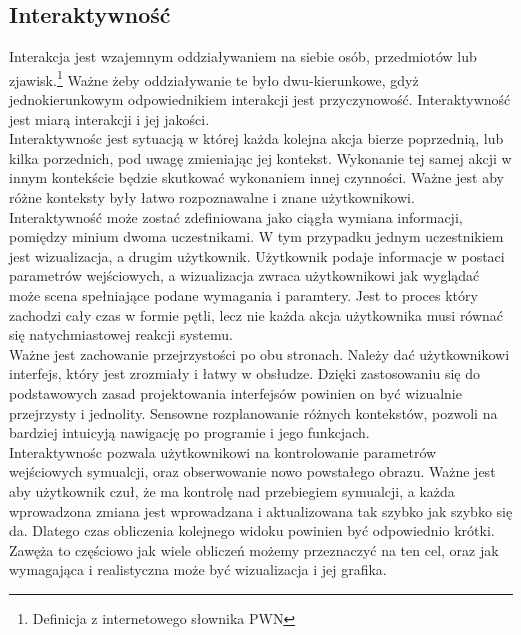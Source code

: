 \documentclass{article} %
\begin{document}
    \subsection{Interaktywność}
        Interakcja jest wzajemnym oddziaływaniem na siebie osób, przedmiotów lub zjawisk.\footnote[1]{Definicja z internetowego słownika PWN} Ważne żeby oddziaływanie te było dwu-kierunkowe, gdyż jednokierunkowym odpowiednikiem interakcji jest przyczynowość. Interaktywność jest miarą interakcji i jej jakości. 
        \\
    
        Interaktywnośc jest sytuacją w której każda kolejna akcja bierze poprzednią, lub kilka porzednich, pod uwagę zmieniając jej kontekst. Wykonanie tej samej akcji w innym kontekście będzie skutkować wykonaniem innej czynności. Ważne jest aby różne konteksty były łatwo rozpoznawalne i znane użytkownikowi.
        \\
    
        Interaktywność może zostać zdefiniowana jako ciągła wymiana informacji, pomiędzy minium dwoma uczestnikami.  W tym przypadku jednym uczestnikiem jest wizualizacja, a drugim użytkownik. Użytkownik podaje informacje w postaci parametrów wejściowych, a wizualizacja zwraca użytkownikowi jak wyglądać może scena spełniające podane wymagania i paramtery. Jest to proces który zachodzi cały czas w formie pętli, lecz nie każda akcja użytkownika musi równać się natychmiastowej reakcji systemu.
        \\
        
        Ważne jest zachowanie przejrzystości po obu stronach. Należy dać użytkownikowi interfejs, który jest zrozmiały i łatwy w obsłudze. Dzięki zastosowaniu się do podstawowych zasad projektowania interfejsów powinien on być wizualnie przejrzysty i jednolity. Sensowne rozplanowanie różnych kontekstów, pozwoli na bardziej intuicyją nawigację po programie i jego funkcjach.
        \\
    
        Interaktywnośc pozwala użytkownikowi na kontrolowanie parametrów wejściowych symualcji, oraz obserwowanie nowo powstałego obrazu. Ważne jest aby użytkownik czuł, że ma kontrolę nad przebiegiem symualcji, a każda wprowadzona zmiana jest wprowadzana i aktualizowana tak szybko jak szybko się da. Dlatego czas obliczenia kolejnego widoku powinien być odpowiednio krótki. Zawęża to częściowo jak wiele obliczeń możemy przeznaczyć na ten cel, oraz jak wymagająca i realistyczna może być wizualizacja i jej grafika. 
        \\
        
\end{document}
